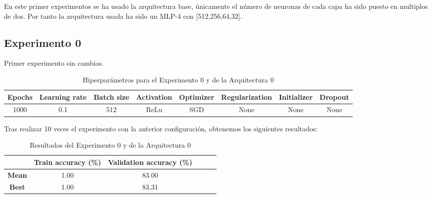 \documentclass{article}
\begin{document}
	\label{j-s-a0} %
		En este primer experimentos se ha usado la arquitectura base, \'unicamente el n\'umero de neuronas de cada capa ha sido puesto en multiplos de dos. 
        Por tanto la arquitectura usada ha sido un MLP-4 con [512,256,64,32].
		
		\subsection{Experimento 0}
		\label{j-s-a0-e0} %
			Primer experimento sin cambios.
			
			\begin{table}[!h]
				\begin{center}
					\begin{tabular}{| c | c | c | c | c | c | c | c |}
						\textbf{Epochs} & \textbf{Learning rate} & \textbf{Batch size} & \textbf{Activation} & \textbf{Optimizer} & \textbf{Regularization} & \textbf{Initializer} & \textbf{Dropout}\\ \hline
						1000 & 0.1 & 512 & ReLu & SGD & None & None & None
					\end{tabular}
					\caption{Hiperpar\'ametros para el Experimento 0 y de la Arquitectura 0}
					\label{tab:hip-j-a0-e0}
				\end{center}
			\end{table}
			
			Tras realizar 10 veces el experimento con la anterior configuraci\'on, obtenemos los siguientes resultados:
			\begin{table}[!h]
				\begin{center}
					\begin{tabular}{ c | c | c | c | c | c |}
						\ & \textbf{Train accuracy (\%)} & \textbf{Validation accuracy (\%)}  \\ \hline
						\textbf{Mean} & 1.00 & 83.00 \\ \hline
						\textbf{Best} & 1.00 & 83.31 \\ \hline
					\end{tabular}
					\caption{Resultados del Experimento 0 y de la Arquitectura 0}
					\label{tab:res-j-a0-e0}
				\end{center}
			\end{table}
		    
\end{document}
